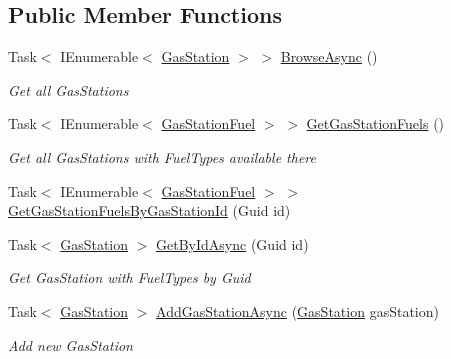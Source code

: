 \subsection*{Public Member Functions}
\begin{DoxyCompactItemize}
\item 
Task$<$ I\+Enumerable$<$ \mbox{\hyperlink{class_gasoline_1_1_data_1_1_models_1_1_gas_station}{Gas\+Station}} $>$ $>$ \mbox{\hyperlink{interface_gasoline_1_1_data_1_1_services_1_1_i_gas_station_service_a22a21285a89cfffb01dfe3bedffa63f5}{Browse\+Async}} ()
\begin{DoxyCompactList}\small\item\em Get all Gas\+Stations \end{DoxyCompactList}\item 
Task$<$ I\+Enumerable$<$ \mbox{\hyperlink{class_gasoline_1_1_data_1_1_models_1_1_gas_station_fuel}{Gas\+Station\+Fuel}} $>$ $>$ \mbox{\hyperlink{interface_gasoline_1_1_data_1_1_services_1_1_i_gas_station_service_a6ce56950a33e26aa14da2e8b1b92948b}{Get\+Gas\+Station\+Fuels}} ()
\begin{DoxyCompactList}\small\item\em Get all Gas\+Stations with Fuel\+Types available there \end{DoxyCompactList}\item 
Task$<$ I\+Enumerable$<$ \mbox{\hyperlink{class_gasoline_1_1_data_1_1_models_1_1_gas_station_fuel}{Gas\+Station\+Fuel}} $>$ $>$ \mbox{\hyperlink{interface_gasoline_1_1_data_1_1_services_1_1_i_gas_station_service_a6e69c73a645741984d2dc56cdd1a835c}{Get\+Gas\+Station\+Fuels\+By\+Gas\+Station\+Id}} (Guid id)
\item 
Task$<$ \mbox{\hyperlink{class_gasoline_1_1_data_1_1_models_1_1_gas_station}{Gas\+Station}} $>$ \mbox{\hyperlink{interface_gasoline_1_1_data_1_1_services_1_1_i_gas_station_service_addc95df8cbebea3094ad37655746bba2}{Get\+By\+Id\+Async}} (Guid id)
\begin{DoxyCompactList}\small\item\em Get Gas\+Station with Fuel\+Types by Guid \end{DoxyCompactList}\item 
Task$<$ \mbox{\hyperlink{class_gasoline_1_1_data_1_1_models_1_1_gas_station}{Gas\+Station}} $>$ \mbox{\hyperlink{interface_gasoline_1_1_data_1_1_services_1_1_i_gas_station_service_ae0bb2d899701dddd473667980e7533d2}{Add\+Gas\+Station\+Async}} (\mbox{\hyperlink{class_gasoline_1_1_data_1_1_models_1_1_gas_station}{Gas\+Station}} gas\+Station)
\begin{DoxyCompactList}\small\item\em Add new Gas\+Station \end{DoxyCompactList}\item 

\end{DoxyCompactItemize}
